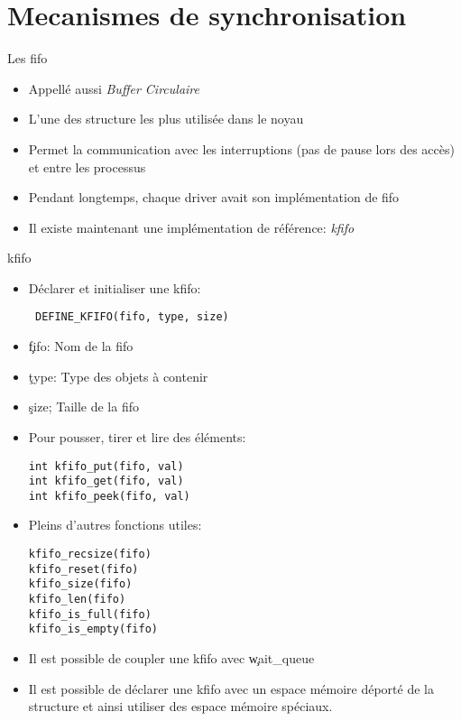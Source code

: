 
\section{Mecanismes de synchronisation}

\begin{frame}[fragile=singleslide]{Les fifo}
  \begin{itemize} 
  \item Appellé aussi \emph{Buffer Circulaire}
  \item L'une des structure les plus utilisée dans le noyau
  \item Permet la communication avec les interruptions (pas de pause
    lors des accès) et entre les processus
  \item Pendant longtemps, chaque driver avait son implémentation de
    fifo
  \item Il existe maintenant une implémentation de référence:
    \emph{kfifo}
  \end{itemize} 
\end{frame} 

\begin{frame}[fragile=singleslide]{kfifo}
\begin{itemize}
\item Déclarer et initialiser une kfifo: 
\begin{lstlisting} 
 DEFINE_KFIFO(fifo, type, size)
\end{lstlisting} 
\item \c{fifo}: Nom de la fifo
\item \c{type}: Type des objets à contenir
\item \c{size}; Taille de la fifo
\item Pour pousser, tirer et lire des éléments:
\begin{lstlisting} 
int kfifo_put(fifo, val) 
int kfifo_get(fifo, val)
int kfifo_peek(fifo, val)
\end{lstlisting} 
\item Pleins d'autres fonctions utiles:
\begin{lstlisting}
kfifo_recsize(fifo)
kfifo_reset(fifo) 
kfifo_size(fifo)  
kfifo_len(fifo)
kfifo_is_full(fifo)
kfifo_is_empty(fifo)
\end{lstlisting} 
\item Il est possible de coupler une kfifo avec \c{wait_queue}
\item Il est possible de déclarer une kfifo avec un espace mémoire
  déporté de la structure et ainsi utiliser des espace mémoire
  spéciaux.
\end{itemize} 
\end{frame} 

